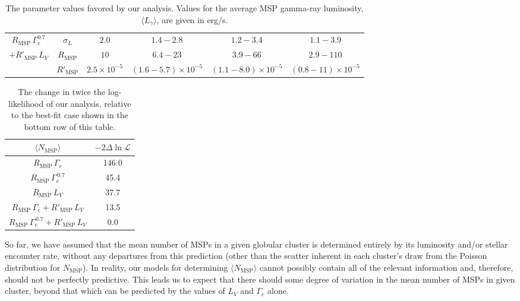 \documentclass[a4paper,11pt]{article}
\begin{document}
\begin{table}[t]
{\begin{tabular}{|c|c|cccc|}
     $R_\textrm{MSP} \, \Gamma_e^{0.7}$ & $\sigma_L$ & $2.0$& $1.4 - 2.8$& $1.2 - 3.4$& $1.1 - 3.9$ \\
    $+R'_\textrm{MSP}\,L_V$& $R_\textrm{MSP}$ & $10$& $6.4-23$& $3.9 - 66$& $2.9 - 110$ \\
    & $R'_\textrm{MSP}$ & $2.5\times 10^{-5}$& $(1.6-5.7)\times 10^{-5}$& $(1.1-8.0)\times 10^{-5}$& $(0.8-11)\times 10^{-5}$ \\
    \hline   
\end{tabular}
}
\caption{The parameter values favored by our analysis. Values for the average MSP gamma-ray luminosity, $\langle L_{\gamma} \rangle$, are given in erg/s.}
\label{tab:param_constraints}
\end{table}

\begin{table}[t]
\centering
\normalsize
\vspace{12pt}
{\renewcommand{\arraystretch}{1.2}
\begin{tabular}{|c|c|}
    \hline $\langle N_\textrm{MSP}\rangle$ & $-2\Delta \ln \mathcal{L}$\\
    \hline\hline
       $R_\textrm{MSP} \, \Gamma_e$ & 146.0 \\
    \hline
       $R_\textrm{MSP} \, \Gamma_e^{\,0.7}$ & 45.4 \\
    \hline
       $R_\textrm{MSP} \, L_V$ & 37.7 \\
    \hline    
       $R_\textrm{MSP} \, \Gamma_e +R'_\textrm{MSP}\,L_V$ & 13.5 \\
    \hline  
       $R_\textrm{MSP} \, \Gamma_e^{\,0.7} +R'_\textrm{MSP}\,L_V$ & 0.0 \\
    \hline      
\end{tabular}
}
\caption{The change in twice the log-likelihood of our analysis, relative to the best-fit case shown in the bottom row of this table.}
\label{tab:models_compare}
\end{table}

So far, we have assumed that the mean number of MSPs in a given globular cluster is determined entirely by its luminosity and/or stellar encounter rate, without any departures from this prediction (other than the scatter inherent in each cluster's draw from the Poisson distribution for $N_\textrm{MSP}$). In reality, our models for determining $\langle N_\textrm{MSP} \rangle$ cannot possibly contain all of the relevant information and, therefore, should not be perfectly predictive. This leads us to expect that there should some degree of variation in the mean number of MSPs in given cluster, beyond that which can be predicted by the values of $L_V$ and $\Gamma_e$ alone. 
\end{document}
